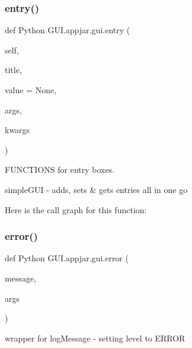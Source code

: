 \subsubsection{\texorpdfstring{entry()}{entry()}}
{\footnotesize\ttfamily def Python G\+U\+I.\+appjar.\+gui.\+entry (\begin{DoxyParamCaption}\item[{}]{self,  }\item[{}]{title,  }\item[{}]{value = {\ttfamily None},  }\item[{}]{args,  }\item[{}]{kwargs }\end{DoxyParamCaption})}



F\+U\+N\+C\+T\+I\+O\+NS for entry boxes. 

\begin{DoxyVerb}simpleGUI - adds, sets & gets entries all in one go \end{DoxyVerb}
 Here is the call graph for this function\+:
\mbox{\label{class_python_01_g_u_i_1_1appjar_1_1gui_af22f729601dae6a052666888083813af}} 
\subsubsection{\texorpdfstring{error()}{error()}}
{\footnotesize\ttfamily def Python G\+U\+I.\+appjar.\+gui.\+error (\begin{DoxyParamCaption}\item[{}]{message,  }\item[{}]{args }\end{DoxyParamCaption})\hspace{0.3cm}{\ttfamily [static]}}

\begin{DoxyVerb}wrapper for logMessage - setting level to ERROR \end{DoxyVerb}
 \mbox{\label{class_python_01_g_u_i_1_1appjar_1_1gui_a3ebce57fe91b6a89c40aa445d14b7421}} 
